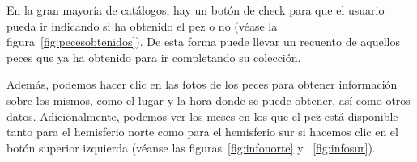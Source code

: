 En la gran mayoría de catálogos, hay un botón de check para que el usuario pueda ir indicando si ha obtenido el pez o no {(v\'ease la figura~\ref{fig:pecesobtenidos})}. De esta forma puede llevar un recuento de aquellos peces que ya ha obtenido para ir completando su colección.\\


\clearpage

Además, podemos hacer clic en las fotos de los peces para obtener información sobre los mismos, como el lugar y la hora donde se puede obtener, así como otros datos. Adicionalmente, podemos ver los meses en los que el pez está disponible tanto para el hemisferio norte como para el hemisferio sur si hacemos clic en el botón superior izquierda {(v\'eanse las figuras~\ref{fig:infonorte} y ~\ref{fig:infosur})}.\\

